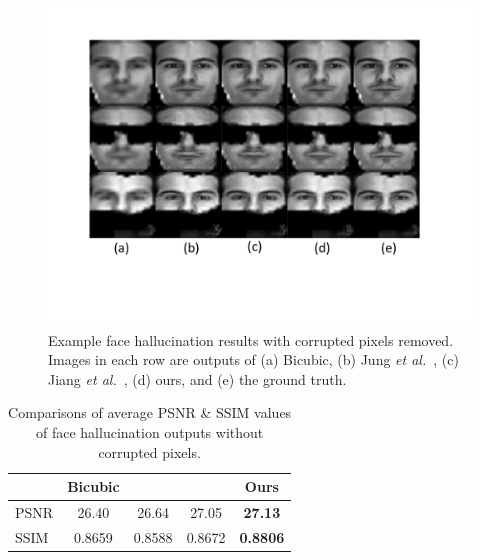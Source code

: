 \begin{figure}
\graphicspath{{fig/}}
        \begin{center}
            \includegraphics[scale=0.32]{exp_masked.pdf}
            \vspace{-0.3cm}
            \caption{\small{Example face hallucination results with corrupted pixels removed. Images in each row are outputs of (a) Bicubic, (b) Jung \emph{et al.}~\cite{convex}, (c) Jiang \emph{et al.}~\cite{Jiang_TMM2014}, (d) ours, and (e) the ground truth.} \label{fig:exp_msk}}
        \end{center}\vspace{-.5cm}
\end{figure}
\begin{table}
\small
\renewcommand{\arraystretch}{1.2}
\centering
\caption{\small{Comparisons of average PSNR \& SSIM values of face hallucination outputs without corrupted pixels.}} \label{tab:partB}
\vspace{0.2cm}
\begin{tabular}{|l|c|c|c|c|}
\hline
 & Bicubic & \cite{convex} & \cite{Jiang_TMM2014}  & Ours\\
 \hline
PSNR  & 26.40 & 26.64 & 27.05 & \textbf{27.13}\\
\hline
SSIM  & 0.8659  & 0.8588  & 0.8672 & \textbf{0.8806}\\
\hline
\end{tabular}\vspace{-.3cm}
\end{table}


